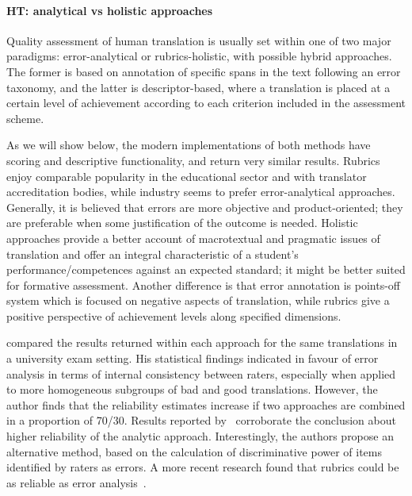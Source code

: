 \paragraph{\label{par:ht_ass}HT: analytical vs holistic approaches} Quality assessment of human translation is usually set within one of two major paradigms: error-analytical or rubrics-holistic, with possible hybrid approaches. The former is based on annotation of specific spans in the text following an error taxonomy, and the latter is descriptor-based, where a translation is placed at a certain level of achievement according to each criterion included in the assessment scheme. 

As we will show below, the modern implementations of both methods have scoring and descriptive functionality, and return very similar results. 
Rubrics enjoy comparable popularity in the educational sector and with translator accreditation bodies, while industry seems to prefer error-analytical approaches. Generally, it is believed that errors are more objective and product-oriented; they are preferable when some justification of the outcome is needed.  Holistic approaches provide a better account of macrotextual and pragmatic issues of translation and offer an integral characteristic of a student's performance/competences against an expected standard; it might be better suited for formative assessment. Another difference is that error annotation is points-off system which is focused on negative aspects of translation, while rubrics give a positive perspective of achievement levels along specified dimensions.

\citet{Waddington2001} compared the results returned within each approach for the same translations in a university exam setting. His statistical findings indicated in favour of error analysis in terms of internal consistency between raters, especially when applied to more homogeneous subgroups of bad and good translations. However, the author finds that the reliability estimates increase if two approaches are combined in a proportion of 70/30. Results reported by~\citet{Eyckmans2009} corroborate the conclusion about higher reliability of the analytic approach. Interestingly, the authors propose an alternative method, based on the calculation of discriminative power of items identified by raters as errors. A more recent research found that rubrics could be as reliable as error analysis~\cite{Turner2010}.

